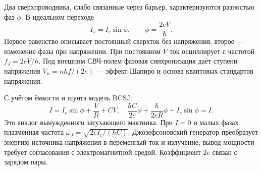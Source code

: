 
Два сверхпроводника, слабо связанные через барьер, характеризуются разностью фаз $\phi$. В идеальном переходе
\begin{equation}
 I_s=I_c\sin\phi,\qquad \dot\phi=\frac{2eV}{\hbar}.
\end{equation}
Первое равенство описывает постоянный сверхток без напряжения; второе — изменение фазы при напряжении. При постоянном $V$ ток осциллирует с частотой $f_J=2eV/h$. Под внешним СВЧ-полем фазовая синхронизация даёт ступени напряжения $V_n=nhf/(2e)$ — эффект Шапиро и основа квантовых стандартов напряжения.

С учётом ёмкости и шунта модель RCSJ:
\begin{equation}
 I=I_c\sin\phi+\frac VR+C\dot V,
 \quad \frac{\hbar C}{2e}\ddot\phi+\frac{\hbar}{2eR}\dot\phi+I_c\sin\phi=I.
\end{equation}
Это аналог вынужденного затухающего маятника. При $I=0$ и малых фазах плазменная частота $\omega_J=\sqrt{2eI_c/(\hbar C)}$. Джозефсоновский генератор преобразует энергию источника напряжения в переменный ток и излучение; вывод мощности требует согласования с электромагнитной средой. Коэффициент $2e$ связан с зарядом пары.
